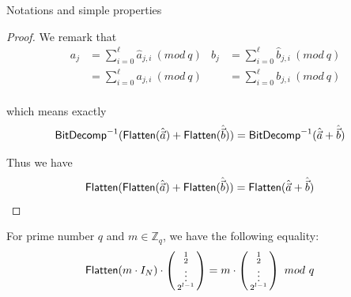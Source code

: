 \begin{section}{Notations and simple properties}
\begin{proof}
    We remark that
    \begin{align*}
      a_{j} &= \sum_{i = 0}^{\ell}\hat{a}_{j, i}~(mod~q) & b_{j} &= \sum_{i = 0}^{\ell} \hat{b}_{j, i}~(mod~q)\\
      &= \sum_{i = 0}^{\ell}a_{j, i}~(mod~q) & &= \sum_{i = 0}^{\ell} b_{j, i}~(mod~q)\\
    \end{align*}

    which means exactly
    \begin{align*}
      {\mathsf{BitDecomp}}^{-1}({\mathsf{Flatten}}(\hat{\vec{a}}) + {\mathsf{Flatten}}(\hat{\vec{b}})) &= {\mathsf{BitDecomp}}^{-1}(\hat{\vec{a}}+ \hat{\vec{b}})
    \end{align*}

    Thus we have
    \begin{align*}
      {\mathsf{Flatten}}({\mathsf{Flatten}}(\hat{\vec{a}}) + {\mathsf{Flatten}}(\hat{\vec{b}})) &= {\mathsf{Flatten}}(\hat{\vec{a}}+ \hat{\vec{b}})
    \end{align*}
    
  \end{proof}

  \begin{lemma}\label{rm-flatten}
    For prime number $q$ and $m \in \mathbb{Z}_q$, we have the following equality:
    \begin{align*}
      {\mathsf{Flatten}}(m \cdot I_N) \cdot \left( \begin{smallmatrix} 1\\ 2\\ \vdots\\ 2^{l-1}  \end{smallmatrix}\right) &= m \cdot \left( \begin{smallmatrix} 1\\ 2\\ \vdots\\ 2^{l-1}  \end{smallmatrix}\right) ~mod~q
    \end{align*}
  \end{lemma}
  


  
  
\end{section}


